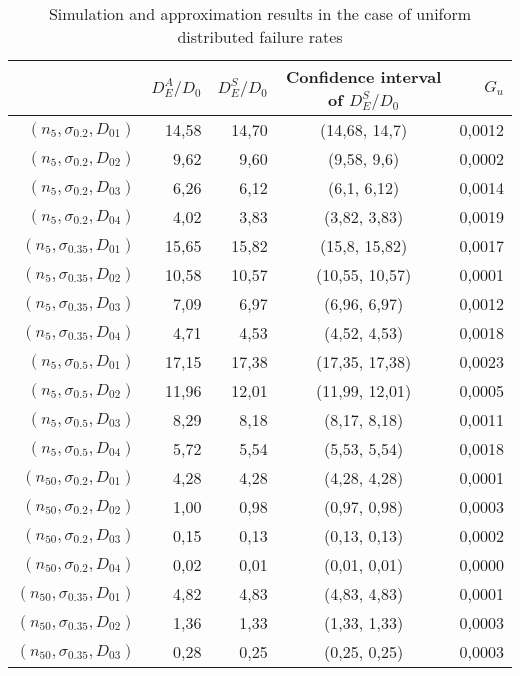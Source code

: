 \documentclass[preprint,12pt]{elsarticle}
\begin{document}
\begin{table}[htbp]
  \centering
  \caption{Simulation and approximation results in the case of uniform distributed failure rates}
 \begin{tabular}{rrrcr}
    \toprule
          & $D_{E}^{A}/D_0$ & $D_{E}^{S}/D_0$ & Confidence interval of $D_{E}^{S}/D_0$ &  $G_{u}$ \\
    \midrule
    $(n_{5},\sigma_{0.2},D_{01})$ & 14,58 & 14,70 & (14,68, 14,7) & 0,0012 \\
    $(n_{5},\sigma_{0.2},D_{02})$  & 9,62  & 9,60  & (9,58, 9,6) & 0,0002 \\
    $(n_{5},\sigma_{0.2},D_{03})$  & 6,26  & 6,12  & (6,1, 6,12) & 0,0014 \\
    $(n_{5},\sigma_{0.2},D_{04})$  & 4,02  & 3,83  & (3,82, 3,83) & 0,0019 \\
    $(n_{5},\sigma_{0.35},D_{01})$ & 15,65 & 15,82 & (15,8, 15,82) & 0,0017 \\
    $(n_{5},\sigma_{0.35},D_{02})$ & 10,58 & 10,57 & (10,55, 10,57) & 0,0001 \\
    $(n_{5},\sigma_{0.35},D_{03})$ & 7,09  & 6,97  & (6,96, 6,97) & 0,0012 \\
    $(n_{5},\sigma_{0.35},D_{04})$ & 4,71  & 4,53  & (4,52, 4,53) & 0,0018 \\
    $(n_{5},\sigma_{0.5},D_{01})$ & 17,15 & 17,38 & (17,35, 17,38) & 0,0023 \\
    $(n_{5},\sigma_{0.5},D_{02})$ & 11,96 & 12,01 & (11,99, 12,01) & 0,0005 \\
    $(n_{5},\sigma_{0.5},D_{03})$ & 8,29  & 8,18  & (8,17, 8,18) & 0,0011 \\
    $(n_{5},\sigma_{0.5},D_{04})$ & 5,72  & 5,54  & (5,53, 5,54) & 0,0018\\
    $(n_{50},\sigma_{0.2},D_{01})$  & 4,28  & 4,28  & (4,28, 4,28) & 0,0001 \\
    $(n_{50},\sigma_{0.2},D_{02})$ & 1,00  & 0,98  & (0,97, 0,98) & 0,0003 \\
    $(n_{50},\sigma_{0.2},D_{03})$  & 0,15  & 0,13  & (0,13, 0,13) & 0,0002 \\
    $(n_{50},\sigma_{0.2},D_{04})$  & 0,02  & 0,01  & (0,01, 0,01) & 0,0000 \\
    $(n_{50},\sigma_{0.35},D_{01})$ & 4,82  & 4,83  & (4,83, 4,83) & 0,0001 \\
    $(n_{50},\sigma_{0.35},D_{02})$ & 1,36  & 1,33  & (1,33, 1,33) & 0,0003 \\
    $(n_{50},\sigma_{0.35},D_{03})$ & 0,28  & 0,25  & (0,25, 0,25) & 0,0003 \\

\end{tabular}
\end{table}
\end{document}
